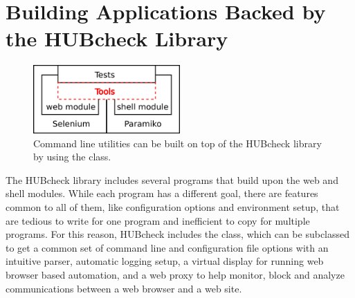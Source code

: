 
\section{Building Applications Backed by the HUBcheck Library}
\label{sec:building_hubcheck_backed_applications}

\begin{figure}[tbh]
  \centering
  \includegraphics[width=0.5\textwidth]
    {../../images/hubcheck_block_diagram/hubcheck_library_overview_tools.png}
  \caption{ Command line utilities can be built on top of the HUBcheck %
            library by using the  class. }
  \label{fig:hubzero_library_overview_tools}
\end{figure}

The HUBcheck library includes several programs that build upon the web and
shell modules. While each program has a different goal, there are features
common to all of them, like configuration options and environment setup, that
are tedious to write for one program and inefficient to copy for multiple
programs. For this reason, HUBcheck includes the  class,
which can be subclassed to get a common set of command line and configuration
file options with an intuitive parser, automatic logging setup, a virtual
display for running web browser based automation, and a web proxy to help
monitor, block and analyze communications between a web browser and a web site.

